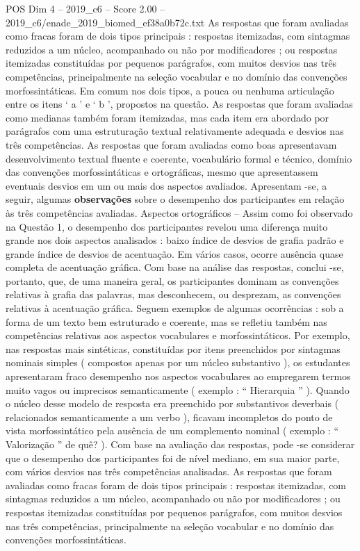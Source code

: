\begin{textsample}{POS Dim 4 – 2019\_c6 – Score 2.00 – 2019\_c6/enade\_2019\_biomed\_ef38a0b72c.txt}
As respostas que foram avaliadas como fracas foram de dois tipos principais : respostas itemizadas, com sintagmas reduzidos a um núcleo, acompanhado ou não por modificadores ; ou respostas itemizadas constituídas por pequenos parágrafos, com muitos desvios nas três competências, principalmente na seleção vocabular e no domínio das convenções morfossintáticas.
Em comum nos dois tipos, a pouca ou nenhuma articulação entre os itens ‘ a ’ e ‘ b ’, propostos na questão.
As respostas que foram avaliadas como medianas também foram itemizadas, mas cada item era abordado por parágrafos com uma estruturação textual relativamente adequada e desvios nas três competências.
As respostas que foram avaliadas como boas apresentavam desenvolvimento textual fluente e coerente, vocabulário formal e técnico, domínio das convenções morfossintáticas e ortográficas, mesmo que apresentassem eventuais desvios em um ou mais dos aspectos avaliados.
Apresentam -se, a seguir, algumas \textbf{observações} sobre o desempenho dos participantes em relação às três competências avaliadas.
Aspectos ortográficos – Assim como foi observado na Questão 1, o desempenho dos participantes revelou uma diferença muito grande nos dois aspectos analisados : baixo índice de desvios de grafia padrão e grande índice de desvios de acentuação.
Em vários casos, ocorre ausência quase completa de acentuação gráfica.
Com base na análise das respostas, conclui -se, portanto, que, de uma maneira geral, os participantes dominam as convenções relativas à grafia das palavras, mas desconhecem, ou desprezam, as convenções relativas à acentuação gráfica.
Seguem exemplos de algumas ocorrências : sob a forma de um texto bem estruturado e coerente, mas se refletiu também nas competências relativas aos aspectos vocabulares e morfossintáticos.
Por exemplo, nas respostas mais sintéticas, constituídas por itens preenchidos por sintagmas nominais simples ( compostos apenas por um núcleo substantivo ), os estudantes apresentaram fraco desempenho nos aspectos vocabulares ao empregarem termos muito vagos ou imprecisos semanticamente ( exemplo : “ Hierarquia ” ).
Quando o núcleo desse modelo de resposta era preenchido por substantivos deverbais ( relacionados semanticamente a um verbo ), ficavam incompletos do ponto de vista morfossintático pela ausência de um complemento nominal ( exemplo : “ Valorização ” de quê? ).
Com base na avaliação das respostas, pode -se considerar que o desempenho dos participantes foi de nível mediano, em sua maior parte, com vários desvios nas três competências analisadas.
As respostas que foram avaliadas como fracas foram de dois tipos principais : respostas itemizadas, com sintagmas reduzidos a um núcleo, acompanhado ou não por modificadores ; ou respostas itemizadas constituídas por pequenos parágrafos, com muitos desvios nas três competências, principalmente na seleção vocabular e no domínio das convenções morfossintáticas.

\end{textsample}
